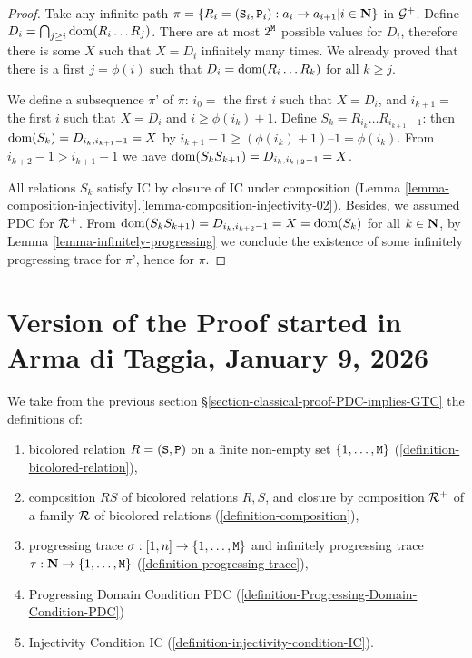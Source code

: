 \documentclass{lmcs}
\begin{document}
\begin{proof}
Take any infinite path $\pi = \{R_i = ({\tt S}_i,{\tt P}_i) : a_i \rightarrow a_{i+1} | i \in {\bf N}\}$ 
in ${\mathcal G}^+$. Define $D_i = \bigcap_{j \ge i} {\rm dom}(R_i \ldots R_j)$. 
There are at most $2^{{\tt M}}$ 
possible values for $D_i$, therefore there is some $X$ such that $X=D_i$ infinitely many 
times. We already proved that there is a first $j = \phi(i)$ such that $D_i = {\rm dom}(R_i \ldots R_k)
$ for all $k \ge j$.

We define a subsequence $\pi’$ of $\pi$: $i_0 =$ the first $i$ such that $X = D_i$, and $i_{k+1} =$ the first $i$ such that $X= D_i$ and $i  \ge \phi(i_k) + 1$. Define $S_k = R_{i_k} \ldots R_{i_{k+1}-1}$: then ${\rm dom}(S_k) = D_{i_k, i_{k+1}-1} = X$ by $i_{k+1} -1 \ge (\phi(i_k) + 1) – 1 = \phi(i_k)$. From $ i_{k+2}-1 > i_{k+1}-1$ we have ${\rm dom}(S_k S_{k+1}) = D_{i_k, i_{k+2}-1} = X$. 

All relations $S_k$ satisfy IC by closure of IC under composition (Lemma \ref{lemma-composition-injectivity}.\ref{lemma-composition-injectivity-02}). Besides, we assumed PDC for ${\mathcal R}^+$. 
From ${\rm dom}(S_k S_{k+1}) = D_{i_k, i_{k+2}-1} = X = {\rm dom}(S_k)$ for all $k \in {\bf N}$, 
by Lemma \ref{lemma-infinitely-progressing} we conclude the existence of some infinitely progressing trace for $\pi’$, hence for $\pi$.
\end{proof}

\newpage


\section{Version of the Proof started in Arma di Taggia, January 9, 2026}
We take from the previous section \S \ref{section-classical-proof-PDC-implies-GTC} 
the definitions of: 
\begin{enumerate}
\item
bicolored relation $R = ({\tt S}, {\tt P})$ on a finite non-empty set 
$\{1, \ldots, {\tt M}\}$  (\ref{definition-bicolored-relation}), 
\item
composition $RS$ of bicolored relations $R,S$, and closure by composition ${\mathcal R}^+$ 
of a family ${\mathcal R}$ of bicolored relations (\ref{definition-composition}),
\item
progressing trace $\sigma:[1,n] \rightarrow \{1,\ldots,{\tt M}\}$
and infinitely progressing trace
$\tau:{\bf N} \rightarrow  \{1,\ldots,{\tt M}\}$ (\ref{definition-progressing-trace}),
\item
Progressing Domain Condition PDC (\ref{definition-Progressing-Domain-Condition-PDC})
\item
Injectivity Condition IC (\ref{definition-injectivity-condition-IC}).
\end{enumerate}
\end{document}
